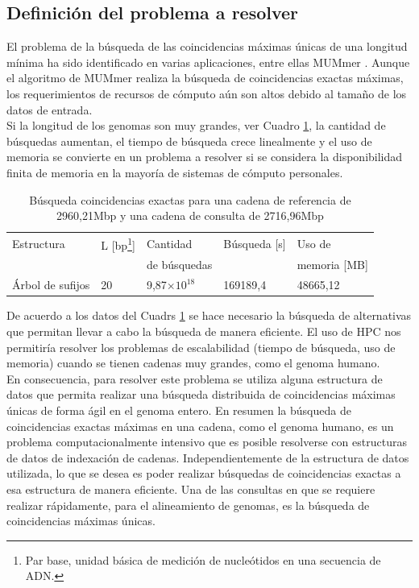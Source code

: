 \documentclass[12pt,a4paper]{article}
\providecommand{\e}[1]{\ensuremath{\times 10^{#1}}}
\begin{document}
\subsection{Definición del problema a resolver}
\indent
El problema de la búsqueda de las coincidencias máximas únicas de una longitud mínima ha sido identificado en varias aplicaciones, entre ellas MUMmer \cite{Mummer3}. Aunque el algoritmo de MUMmer realiza la búsqueda de coincidencias exactas máximas, los requerimientos de recursos de cómputo aún son altos debido al tamaño de los datos de entrada.\\
\indent
Si la longitud de los genomas son muy grandes, ver Cuadro \ref{tab:buscar3}, 
la cantidad de búsquedas aumentan, el tiempo de búsqueda
crece linealmente y el uso de memoria se convierte en un problema a resolver si
se considera la disponibilidad finita de memoria en la mayoría de sistemas de
cómputo personales.\\
\begin{table}[ h!]
  \begin{small}
    \begin{center}
      \begin{tabular}{lllll}
        Estructura & L [bp\footnote{Par base, unidad básica de medición de nucleótidos en una secuencia de ADN.}] & Cantidad  & Búsqueda [s] & Uso de\\
        & & de búsquedas & & memoria [MB]\\
        \hline
        Árbol de sufijos & 20 & 9,87\e{18}  & 169189,4 & 48665,12\\
        \hline
      \end{tabular}
    \end{center}
  \end{small}
  \caption{Búsqueda coincidencias exactas para una cadena de referencia de 
  2960,21Mbp y una cadena de consulta de 2716,96Mbp}
  \label{tab:buscar3}
\end{table}
\indent
De acuerdo a los datos del Cuadrs \ref{tab:buscar3} se hace necesario la búsqueda de alternativas que 
permitan llevar a cabo la búsqueda de manera eficiente. El uso de HPC nos permitiría
resolver los problemas de escalabilidad (tiempo de búsqueda, uso de memoria) cuando 
se tienen cadenas muy grandes, como el genoma humano.\\
En consecuencia, para resolver este problema se utiliza alguna estructura de datos que 
permita realizar una búsqueda distribuida de coincidencias máximas únicas de forma ágil 
en el genoma entero. 
\indent
En resumen la búsqueda de coincidencias exactas máximas en una cadena, como el 
genoma humano, es un problema computacionalmente intensivo que es posible 
resolverse con estructuras de datos de indexación de cadenas. 
\indent
Independientemente de la estructura de datos utilizada, lo que se desea es poder realizar búsquedas de coincidencias exactas a esa estructura de manera eficiente. 
Una de las consultas en que se requiere realizar rápidamente, para el alineamiento de genomas, es la búsqueda de coincidencias máximas únicas. 
\end{document}
